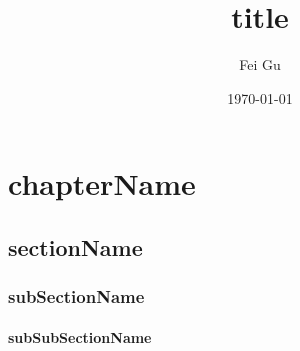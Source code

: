 \documentclass[12pt, a4, utf8]{report}        %
\title{title}                       %
\author{Fei Gu}
\date{\today}
\begin{document}
\maketitle
\tableofcontents


\chapter{chapterName}

\section{sectionName}

\subsection{subSectionName}

\subsubsection{subSubSectionName}






    
\end{document}
